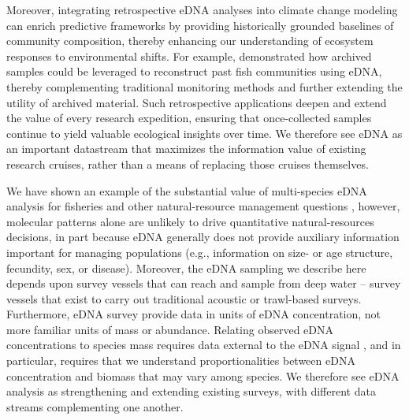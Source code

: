 \documentclass{article}
\begin{document}
Moreover, integrating retrospective eDNA analyses into climate change modeling can enrich predictive frameworks by providing historically grounded baselines of community composition, thereby enhancing our understanding of ecosystem responses to environmental shifts. For example, \cite{diaz2020a} demonstrated how archived samples could be leveraged to reconstruct past fish communities using eDNA, thereby complementing traditional monitoring methods and further extending the utility of archived material. Such retrospective applications deepen and extend the value of every research expedition, ensuring that once-collected samples continue to yield valuable ecological insights over time. We therefore see eDNA as an important datastream that maximizes the information value of existing research cruises, rather than a means of replacing those cruises themselves.


We have shown an example of the substantial value of multi-species eDNA analysis for fisheries and other natural-resource management questions \cite{ledger2024,stoeckle2024}, however, molecular patterns alone are unlikely to drive quantitative natural-resources decisions, in part because eDNA generally does not provide auxiliary information important for managing populations (e.g., information on size- or age structure, fecundity, sex, or disease). Moreover, the eDNA sampling we describe here depends upon survey vessels that can reach and sample from deep water – survey vessels that exist to carry out traditional acoustic or trawl-based surveys. Furthermore, eDNA survey provide data in units of eDNA concentration, not more familiar units of mass or abundance. Relating observed eDNA concentrations to species mass requires data external to the eDNA signal \cite{guri2024a}, and in particular, requires that we understand proportionalities between eDNA concentration and biomass that may vary among species. We therefore see eDNA analysis as strengthening and extending existing surveys, with different data streams complementing one another. 

\end{document}
